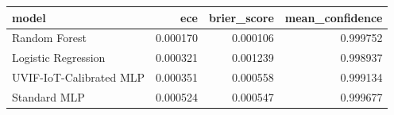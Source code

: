 \begin{tabular}{lrrr}
\toprule
model & ece & brier\_score & mean\_confidence \\
\midrule
Random Forest & 0.000170 & 0.000106 & 0.999752 \\
Logistic Regression & 0.000321 & 0.001239 & 0.998937 \\
UVIF-IoT-Calibrated MLP & 0.000351 & 0.000558 & 0.999134 \\
Standard MLP & 0.000524 & 0.000547 & 0.999677 \\
\bottomrule
\end{tabular}
